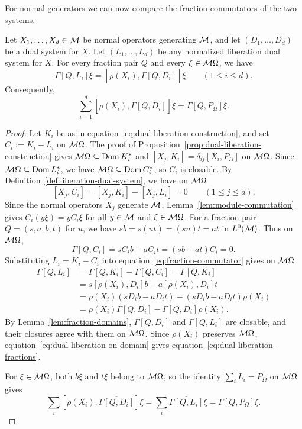 For normal generators we can now compare the fraction commutators of the two systems.

\begin{lemma}\label{lem:fundamental}
Let $X_1,\ldots,X_d\in\mathcal M$ be normal operators generating $\mathcal M$, and let $(D_1,\ldots,D_d)$ be a dual system for $X$.
Let $(L_1,\ldots,L_d)$ be any normalized liberation dual system for $X$.
For every fraction pair $Q$ and every $\xi\in\mathcal M\Omega$, we have
\begin{equation}\label{eq:dual-liberation-fractions}
 \overline{\Gamma[Q,L_i]}\xi
 =[\rho(X_i),\overline{\Gamma[Q,D_i]}]\xi
 \qquad(1\leq i\leq d).
\end{equation}
Consequently,
\begin{equation}\label{eq:fundamental}
 \sum_{i=1}^d[\rho(X_i),\overline{\Gamma[Q,D_i]}]\xi=\Gamma[Q,P_\Omega]\xi.
\end{equation}
\end{lemma}
\begin{proof}
Let $K_i$ be as in equation~\eqref{eq:dual-liberation-construction}, and set $C_i:=K_i-L_i$ on $\mathcal M\Omega$.
The proof of Proposition~\ref{prop:dual-liberation-construction} gives $\mathcal M\Omega\subseteq\operatorname{Dom} K_i^*$ and $[X_j,K_i]=\delta_{ij}[X_i,P_\Omega]$ on $\mathcal M\Omega$.
Since $\mathcal M\Omega\subseteq\operatorname{Dom} L_i^*$, we have $\mathcal M\Omega\subseteq\operatorname{Dom} C_i^*$, so $C_i$ is closable.
By Definition~\ref{def:liberation-dual-system}, we have on $\mathcal M\Omega$
\[
 [X_j,C_i]=[X_j,K_i]-[X_j,L_i]=0
 \qquad(1\leq j\leq d).
\]
Since the normal operators $X_j$ generate $\mathcal M$, Lemma~\ref{lem:module-commutation} gives $C_i(y\xi)=yC_i\xi$ for all $y\in\mathcal M$ and $\xi\in\mathcal M\Omega$.
For a fraction pair $Q=(s,a,b,t)$ for $u$, we have $sb=s(ut)=(su)t=at$ in $L^0(\mathcal M)$.
Thus on $\mathcal M\Omega$,
\[
 \Gamma[Q,C_i]=sC_i b-aC_i t=(sb-at)C_i=0.
\]
Substituting $L_i=K_i-C_i$ into equation~\eqref{eq:fraction-commutator} gives on $\mathcal M\Omega$
\begin{equation}\label{eq:dual-liberation-on-domain}
 \begin{aligned}
  \Gamma[Q,L_i]
  &=\Gamma[Q,K_i]-\Gamma[Q,C_i]
   =\Gamma[Q,K_i]\\
  &=s[\rho(X_i),D_i]b-a[\rho(X_i),D_i]t\\
  &=\rho(X_i)(sD_i b-aD_i t)-(sD_i b-aD_i t)\rho(X_i)\\
  &=\rho(X_i)\Gamma[Q,D_i]-\Gamma[Q,D_i]\rho(X_i).
 \end{aligned}
\end{equation}
By Lemma~\ref{lem:fraction-domains}, $\Gamma[Q,D_i]$ and $\Gamma[Q,L_i]$ are closable, and their closures agree with them on $\mathcal M\Omega$.
Since $\rho(X_i)$ preserves $\mathcal M\Omega$, equation~\eqref{eq:dual-liberation-on-domain} gives equation~\eqref{eq:dual-liberation-fractions}.

For $\xi\in\mathcal M\Omega$, both $b\xi$ and $t\xi$ belong to $\mathcal M\Omega$, so the identity $\sum_iL_i=P_\Omega$ on $\mathcal M\Omega$ gives
\[
 \sum_i[\rho(X_i),\overline{\Gamma[Q,D_i]}]\xi
 =\sum_i\overline{\Gamma[Q,L_i]}\xi=\Gamma[Q,P_\Omega]\xi.
\]
\end{proof}

